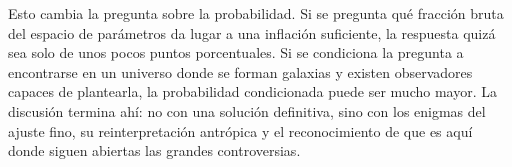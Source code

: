 Esto cambia la pregunta sobre la probabilidad. Si se pregunta qué fracción bruta del espacio de parámetros da lugar a una inflación suficiente, la respuesta quizá sea solo de unos pocos puntos porcentuales. Si se condiciona la pregunta a encontrarse en un universo donde se forman galaxias y existen observadores capaces de plantearla, la probabilidad condicionada puede ser mucho mayor. La discusión termina ahí: no con una solución definitiva, sino con los enigmas del ajuste fino, su reinterpretación antrópica y el reconocimiento de que es aquí donde siguen abiertas las grandes controversias.
